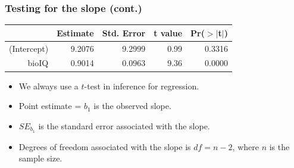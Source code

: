 
\begin{frame}
\frametitle{Testing for the slope (cont.)}

{\footnotesize
\begin{center}
\begin{tabular}{rrrrr}
  \hline
 & Estimate & Std. Error & t value & Pr($>$$|$t$|$) \\ 
  \hline
(Intercept) & 9.2076 & 9.2999 & 0.99 & 0.3316 \\ 
  bioIQ & 0.9014 & 0.0963 & 9.36 & 0.0000 \\ 
   \hline
\end{tabular}
\end{center}
}

\pause

\begin{itemize}

\item We always use a $t$-test in inference for regression. $\:$ \\

\pause


\pause

\item Point estimate = $b_1$ is the observed slope.

\pause

\item $SE_{b_1}$ is the standard error associated with the slope.

\pause

\item Degrees of freedom associated with the slope is $df = n - 2$, where $n$ is the sample size. $\:$ \\
\pause
{}

\end{itemize}

\end{frame}


